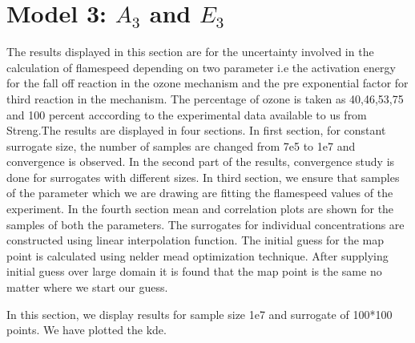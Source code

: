 \section{Model 3: $A_3$ and $E_3$}

The results displayed in this section are for the uncertainty involved in the calculation of flamespeed depending  on two parameter i.e the activation energy for the fall off reaction in the ozone mechanism and the pre exponential factor for third reaction in the mechanism. The percentage of ozone is taken as 40,46,53,75 and 100  percent acccording to the experimental data available to us from Streng\cite{Streng}.The results are displayed in four sections. In first section, for constant surrogate size, the number of samples are changed from 7e5 to 1e7 and convergence is observed. In the second part of the results, convergence study is done for surrogates with different sizes. In third section, we ensure that samples of the parameter which we are drawing are fitting the flamespeed values of the experiment. In the fourth section mean and correlation plots are shown for the samples of both the parameters. The surrogates for individual concentrations are constructed using linear interpolation function. The initial guess for the map point is calculated using nelder mead optimization technique. After supplying initial guess over large domain it is found that the map point is the same no matter where we start our guess. 


\noindent In this section, we display results for sample size 1e7 and surrogate of 100*100 points. We  have plotted the kde. 

